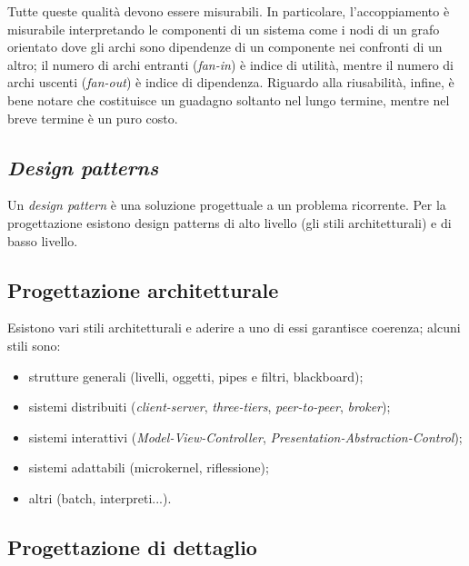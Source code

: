 \documentclass[a4paper]{article}
\begin{document}
		
Tutte queste qualità devono essere misurabili. In particolare, l'accoppiamento è misurabile interpretando le componenti di un sistema come i nodi di un grafo orientato dove gli archi sono dipendenze di un componente nei confronti di un altro; il numero di archi entranti (\emph{fan-in}) è indice di utilità, mentre il numero di archi uscenti (\emph{fan-out}) è indice di dipendenza. Riguardo alla riusabilità, infine, è bene notare che costituisce un guadagno soltanto nel lungo termine, mentre nel breve termine è un puro costo.

		
	\subsection{\emph{Design patterns}}

		
Un \emph{design pattern} è una soluzione progettuale a un problema ricorrente. Per la progettazione esistono design patterns di alto livello (gli stili architetturali) e di basso livello.

		
	\subsection{Progettazione architetturale}

		
Esistono vari stili architetturali e aderire a uno di essi garantisce coerenza; alcuni stili sono:
		
	\begin{itemize}
		
			
	\item strutture generali (livelli, oggetti, pipes e filtri, blackboard);
			
	\item sistemi distribuiti (\emph{client-server}, \emph{three-tiers}, \emph{peer-to-peer}, \emph{broker});
			
	\item sistemi interattivi (\emph{Model-View-Controller}, \emph{Presentation-Abstraction-Control});
			
	\item sistemi adattabili (microkernel, riflessione);
			
	\item altri (batch, interpreti...).
		
	\end{itemize}


		
	\subsection{Progettazione di dettaglio}
\end{document}
